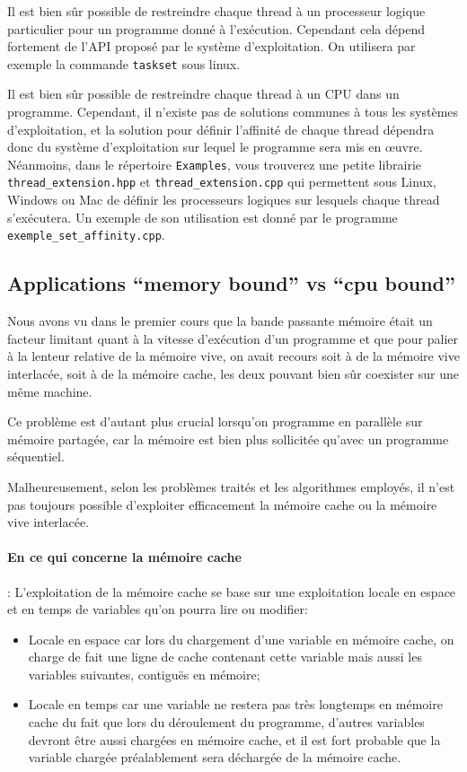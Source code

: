 \documentclass[fleqn,11pt]{article}
\begin{document}
Il est bien sûr possible de restreindre chaque thread à un processeur logique particulier pour un programme donné à l'exécution. Cependant cela dépend fortement de l'API proposé par le système d'exploitation. On utilisera par exemple la commande \texttt{taskset} sous linux.

Il est bien sûr possible de restreindre chaque thread à un CPU dans un programme. Cependant, il n'existe pas de solutions communes à tous les systèmes d'exploitation, et la solution pour définir l'affinité de chaque thread dépendra donc du système d'exploitation sur lequel le programme sera mis en {\oe}uvre. Néanmoins, dans le répertoire \texttt{Examples}, vous trouverez une petite librairie \texttt{thread\_extension.hpp} et
\texttt{thread\_extension.cpp} qui permettent sous Linux, Windows ou Mac de définir les processeurs logiques
sur lesquels chaque thread s'exécutera. Un exemple de son utilisation est donné par le programme
\texttt{exemple\_set\_affinity.cpp}.

\subsection{Applications ``memory bound'' vs ``cpu bound''}

Nous avons vu dans le premier cours que la bande passante mémoire était un facteur limitant quant à la vitesse d'exécution d'un programme et que pour palier à la lenteur relative de la mémoire vive, on avait recours soit à de la mémoire vive interlacée, soit à de la mémoire cache, les deux pouvant bien sûr coexister sur une même machine.

Ce problème est d'autant plus crucial lorsqu'on programme en parallèle sur mémoire partagée, car la mémoire
est bien plus sollicitée qu'avec un programme séquentiel.

Malheureusement, selon les problèmes traités et les algorithmes employés, il n'est pas toujours possible d'exploiter efficacement la mémoire cache ou la mémoire vive interlacée.

\paragraph{En ce qui concerne la mémoire cache} : L'exploitation de la mémoire cache se base sur une exploitation locale en espace et en temps de variables qu'on pourra lire ou modifier:
\begin{itemize}
 \item Locale en espace car lors du chargement d'une variable en mémoire cache, on charge de fait une ligne de cache  contenant cette variable mais aussi les variables suivantes, contiguës en mémoire;
 \item Locale en temps  car une variable ne restera pas très longtemps en mémoire cache du fait que lors du déroulement du programme, d'autres variables devront être aussi chargées en mémoire cache, et il est fort probable que la variable chargée préalablement sera déchargée de la mémoire cache.
\end{itemize}
\end{document}
